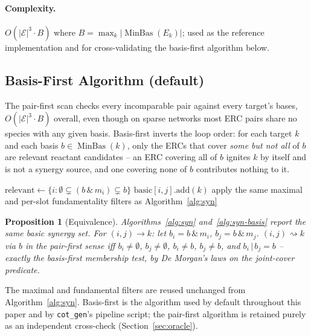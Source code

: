 \documentclass[11pt]{article}
\theoremstyle{plain}
\newtheorem{proposition}{Proposition}
\theoremstyle{remark}
\newcommand{\MinBas}{\operatorname{MinBas}}
\newcommand{\E}{\mathcal{E}}
\begin{document}
\paragraph{Complexity.} $O(|\E|^3 \cdot B)$ where
$B = \max_k|\MinBas(E_k)|$; used as the reference implementation and for
cross-validating the basis-first algorithm below.

\subsection{Basis-First Algorithm (default)}

The pair-first scan checks every incomparable pair against every target's
bases, $O(|\E|^3\!\cdot\!B)$ overall, even though on sparse networks most
ERC pairs share no species with any given basis. Basis-first inverts the
loop order: for each target $k$ and each basis $b\in\MinBas(k)$, only the
ERCs that cover \emph{some but not all} of $b$ are relevant reactant
candidates -- an ERC covering all of $b$ ignites $k$ by itself and is not
a synergy source, and one covering none of $b$ contributes nothing to it.

\begin{algorithm}[t]
\caption{ComputeFundamentalSynergies-BasisFirst($\E$, hier)}\label{alg:syn-basis}
\begin{algorithmic}[1]
\For{each target $k \in \E$}
  \For{each basis $b \in \MinBas(k)$}
    \State $\text{relevant} \leftarrow \{i : \emptyset \subsetneq (b\,\&\,m_i) \subsetneq b\}$
      \State $\text{basic}[i,j].\text{add}(k)$
    \EndFor
  \EndFor
\EndFor
\State apply the same maximal and per-slot fundamentality filters as Algorithm~\ref{alg:syn}
\end{algorithmic}
\end{algorithm}

\begin{proposition}[Equivalence]
Algorithms~\ref{alg:syn} and~\ref{alg:syn-basis} report the same basic
synergy set. For $(i,j)\to k$: let $b_i = b\,\&\,m_i$, $b_j = b\,\&\,m_j$.
$(i,j)\rightsquigarrow k$ via $b$ in the pair-first sense iff
$b_i\neq\emptyset$, $b_j\neq\emptyset$, $b_i\neq b$, $b_j\neq b$, and
$b_i\,|\,b_j = b$ -- exactly the basis-first membership test, by De
Morgan's laws on the joint-cover predicate.
\end{proposition}

The maximal and fundamental filters are reused unchanged from
Algorithm~\ref{alg:syn}. Basis-first is the algorithm used by default
throughout this paper and by \texttt{cot\_gen}'s pipeline script; the
pair-first algorithm is retained purely as an independent cross-check
(Section~\ref{sec:oracle}).
\end{document}

